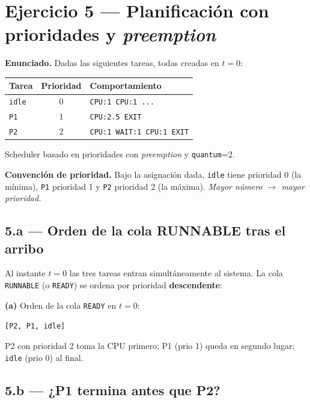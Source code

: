 \documentclass[11pt,a4paper]{article}
\begin{document}
\section{Ejercicio 5 --- Planificación con prioridades y \emph{preemption}}

\textbf{Enunciado.} Dadas las siguientes tareas, todas creadas en
$t=0$:

\begin{center}
\small
\begin{tabular}{@{}lcl@{}}
\toprule
Tarea & Prioridad & Comportamiento \\
\midrule
\texttt{idle} & 0 & \texttt{CPU:1 CPU:1 ...} \\
\texttt{P1}   & 1 & \texttt{CPU:2.5 EXIT} \\
\texttt{P2}   & 2 & \texttt{CPU:1 WAIT:1 CPU:1 EXIT} \\
\bottomrule
\end{tabular}
\end{center}

Scheduler basado en prioridades con \emph{preemption} y
\texttt{quantum}=2.

\textbf{Convención de prioridad.} Bajo la asignación dada, \texttt{idle}
tiene prioridad 0 (la mínima), \texttt{P1} prioridad 1 y \texttt{P2}
prioridad 2 (la máxima). \emph{Mayor número $\to$ mayor prioridad.}

\subsection*{5.a --- Orden de la cola RUNNABLE tras el arribo}

Al instante $t=0$ las tres tareas entran simultáneamente al sistema.
La cola \texttt{RUNNABLE} (o \texttt{READY}) se ordena por prioridad
\textbf{descendente}:

\begin{respuesta}
\textbf{(a)} Orden de la cola \texttt{READY} en $t = 0$:
\begin{center}\Large \texttt{[P2, P1, idle]}\end{center}
P2 con prioridad 2 toma la CPU primero; P1 (prio 1) queda en segundo
lugar; \texttt{idle} (prio 0) al final.
\end{respuesta}

\subsection*{5.b --- ¿P1 termina antes que P2?}
\end{document}
